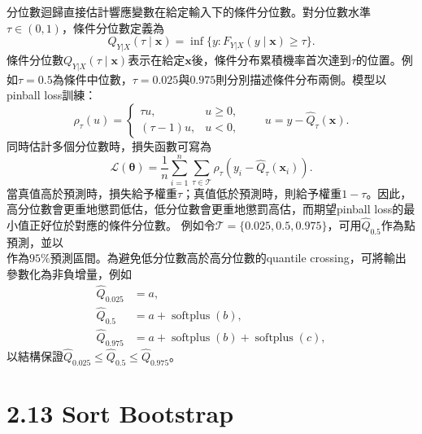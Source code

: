 分位數迴歸直接估計響應變數在給定輸入下的條件分位數\cite{koenker1978}。對分位數水準$\tau\in(0,1)$，條件分位數定義為
\begin{equation}
 Q_{Y|X}(\tau\mid\boldsymbol x)
 =\inf\{y:F_{Y|X}(y\mid\boldsymbol x)\ge\tau\}.
\end{equation}
條件分位數$Q_{Y|X}(\tau\mid\boldsymbol x)$表示在給定$\boldsymbol x$後，條件分布累積機率首次達到$\tau$的位置。例如$\tau=0.5$為條件中位數，$\tau=0.025$與$0.975$則分別描述條件分布兩側。模型以pinball loss訓練：
\begin{equation}
 \rho_\tau(u)=
 \begin{cases}
   \tau u, & u\ge0,\\
   (\tau-1)u, & u<0,
 \end{cases}
 \qquad u=y-\widehat Q_\tau(\boldsymbol x).
\end{equation}
同時估計多個分位數時，損失函數可寫為
\begin{equation}
 \mathcal L(\boldsymbol\theta)
 =\frac{1}{n}\sum_{i=1}^{n}
 \sum_{\tau\in\mathcal T}
 \rho_\tau\!\left(y_i-\widehat Q_\tau(\boldsymbol x_i)\right).
\end{equation}
當真值高於預測時，損失給予權重$\tau$；真值低於預測時，則給予權重$1-\tau$。因此，高分位數會更重地懲罰低估，低分位數會更重地懲罰高估，而期望pinball loss的最小值正好位於對應的條件分位數。
例如令$\mathcal T=\{0.025,0.5,0.975\}$，可用$\widehat Q_{0.5}$作為點預測，並以
\begin{equation}
 [\widehat Q_{0.025},\widehat Q_{0.975}]
\end{equation}
作為$95\%$預測區間。為避免低分位數高於高分位數的quantile crossing，可將輸出參數化為非負增量，例如
\begin{align}
 \widehat Q_{0.025}&=a,\\
 \widehat Q_{0.5}&=a+\operatorname{softplus}(b),\\
 \widehat Q_{0.975}&=a+\operatorname{softplus}(b)
 +\operatorname{softplus}(c),
\end{align}
以結構保證$\widehat Q_{0.025}\le\widehat Q_{0.5}\le\widehat Q_{0.975}$。

\section*{2.13 Sort Bootstrap}

